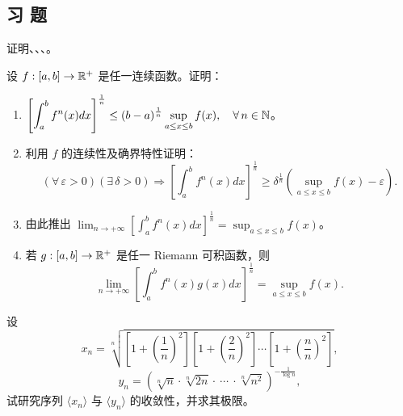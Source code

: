 \subsection*{习 题}

\begin{exercise}
	\item 证明、、、。
\end{exercise}

\begin{exercise}
	\item 设 \(f:[a,b]\to\mathbb{R}^+\) 是任一连续函数。证明：
	\begin{enumerate}[label=\arabic*)]
		\item \(\displaystyle\left[\int_a^b f^n(x)dx\right]^{\frac1n}\le(b-a)^{\frac1n}\sup_{a\le x\le b}f(x),\quad\forall\,n\in\mathbb{N}\)。
		\item 利用 \(f\) 的连续性及确界特性证明：
		\[
		(\forall\,\varepsilon>0)(\exists\,\delta>0)\Longrightarrow\left[\int_a^b f^n(x)dx\right]^{\frac1n}\ge\delta^{\frac1n}\left(\sup_{a\le x\le b}f(x)-\varepsilon\right).
		\]
		\item 由此推出 \(\displaystyle\lim_{n\to+\infty}\left[\int_a^b f^n(x)dx\right]^{\frac1n}=\sup_{a\le x\le b}f(x)\)。
		\item 若 \(g:[a,b]\to\mathbb{R}^+\) 是任一 Riemann 可积函数，则
		\[
		\lim_{n\to+\infty}\left[\int_a^b f^n(x)g(x)dx\right]^{\frac1n}=\sup_{a\le x\le b}f(x).
		\]
	\end{enumerate}
\end{exercise}

\begin{exercise}
	\item 设
	\[
	x_n=\sqrt[n]{\left[1+\left(\frac1n\right)^2\right]\left[1+\left(\frac2n\right)^2\right]\cdots\left[1+\left(\frac nn\right)^2\right]},
	\]
	\[
	y_n=\left(\sqrt[n]{n}\cdot\sqrt[n]{2n}\cdot\ \cdots\ \cdot\sqrt[n]{n^2}\right)^{-\frac1{\log n}},
	\]
	试研究序列 \(\langle x_n\rangle\) 与 \(\langle y_n\rangle\) 的收敛性，并求其极限。
\end{exercise}

